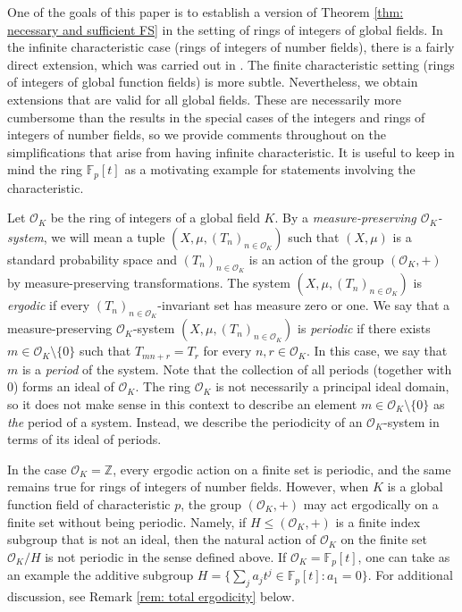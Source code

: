 \documentclass{amsart}
\theoremstyle{definition}
\numberwithin{equation}{section}
\newcommand{\Z}{\mathbb{Z}}
\newcommand{\F}{\mathbb{F}}
\newcommand{\mO}{\mathcal{O}}
\begin{document}
One of the goals of this paper is to establish a version of Theorem \ref{thm: necessary and sufficient FS} in the setting of rings of integers of global fields.
In the infinite characteristic case (rings of integers of number fields), there is a fairly direct extension, which was carried out in \cite{br}.
The finite characteristic setting (rings of integers of global function fields) is more subtle.
Nevertheless, we obtain extensions that are valid for all global fields.
These are necessarily more cumbersome than the results in the special cases of the integers and rings of integers of number fields, so we provide comments throughout on the simplifications that arise from having infinite characteristic.
It is useful to keep in mind the ring $\F_p[t]$ as a motivating example for statements involving the characteristic.

Let $\mO_K$ be the ring of integers of a global field $K$.
By a \emph{measure-preserving $\mO_K$-system}, we will mean a tuple $(X, \mu, (T_n)_{n \in \mO_K})$ such that $(X, \mu)$ is a standard probability space and $(T_n)_{n \in \mO_K}$ is an action of the group $(\mO_K,+)$ by measure-preserving transformations.
The system $(X, \mu, (T_n)_{n \in \mO_K})$ is \emph{ergodic} if every $(T_n)_{n \in \mO_K}$-invariant set has measure zero or one.
We say that a measure-preserving $\mO_K$-system $\left( X, \mu, (T_n)_{n \in \mO_K} \right)$ is \emph{periodic} if there exists $m \in \mO_K \setminus \{0\}$ such that $T_{mn+r} = T_r$ for every $n, r \in \mO_K$.
In this case, we say that $m$ is a \emph{period} of the system.
Note that the collection of all periods (together with 0) forms an ideal of $\mO_K$.
The ring $\mO_K$ is not necessarily a principal ideal domain, so it does not make sense in this context to describe an element $m \in \mO_K \setminus \{0\}$ as \emph{the} period of a system.
Instead, we describe the periodicity of an $\mO_K$-system in terms of its ideal of periods.

In the case $\mO_K = \Z$, every ergodic action on a finite set is periodic, and the same remains true for rings of integers of number fields.
However, when $K$ is a global function field of characteristic $p$, the group $(\mO_K,+)$ may act ergodically on a finite set without being periodic.
Namely, if $H \le (\mO_K,+)$ is a finite index subgroup that is not an ideal, then the natural action of $\mO_K$ on the finite set $\mO_K/H$ is not periodic in the sense defined above.
If $\mO_K = \F_p[t]$, one can take as an example the additive subgroup $H = \{\sum_j a_jt^j \in \F_p[t] : a_1 = 0\}$.
For additional discussion, see Remark \ref{rem: total ergodicity} below.
\end{document}
